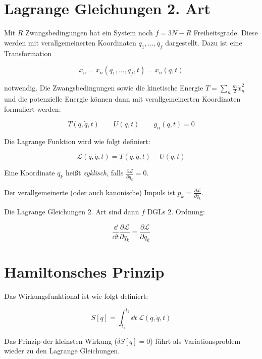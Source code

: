 \section{Lagrange Gleichungen 2. Art}

\begin{frameddefn}

Mit $R$ Zwangsbedingungen hat ein System noch $f = 3N - R$ Freiheitsgrade. Diese werden mit verallgemeinerten Koordinaten $q_1, ... , q_f$ dargestellt. Dazu ist eine Transformation 

\[ x_n = x_n(q_1, ..., q_f, t) = x_n(q,t) \]

notwendig. Die Zwangsbedingungen sowie die kinetische Energie $T = \sum_n \frac{m}{2} \dot x_n^2$ und die potenzielle Energie können dann mit verallgemeinerten Koordinaten formuliert werden:

\[ T(q, \dot q, t) \qquad U(q,t) \qquad g_\alpha(q,t) = 0 \]
	
\end{frameddefn}

\begin{frameddefn}

Die Lagrange Funktion wird wie folgt definiert:

\[ \mathscr{L}(q,\dot q, t) = T(q, \dot q, t) - U(q,t) \]

Eine Koordinate $q_k$ heißt \textit{zyklisch}, falls $\frac{\partial \mathscr{L}}{\partial q_k} = 0$.

Der verallgemeinerte (oder auch kanonische) Impuls ist $p_k = \frac{\partial \mathscr{L}}{\partial \dot q_k}$.

Die Lagrange Gleichungen 2. Art sind dann $f$ DGLs 2. Ordnung:

\[ \frac{\dd}{\dd t} \frac{\partial \mathscr{L}}{\partial \dot q_k} = \frac{\partial \mathscr{L}}{\partial q_k} \]
	
\end{frameddefn}

\newpage
\section{Hamiltonsches Prinzip}

\begin{frameddefn}[Wirkungsfunktional]
	Das Wirkungsfunktional ist wie folgt definiert:
	
	\[ S[q] = \int_{t_1}^{t_2} \dd t \, \mathscr{L}(q, \dot q, t) \]
	
	Das Prinzip der kleinsten Wirkung ($\delta S[q] = 0$) führt als Variationsproblem wieder zu den Lagrange Gleichungen.
\end{frameddefn}


